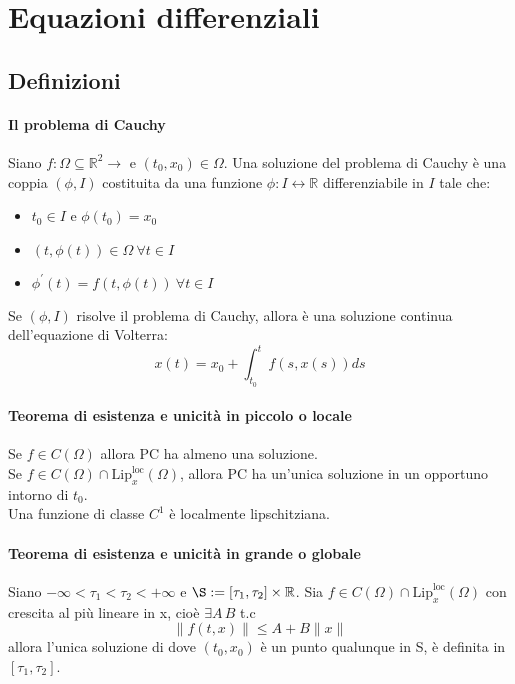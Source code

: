 \documentclass[a4paper,12pt]{article}
\begin{document}
\section{Equazioni differenziali}

\subsection{Definizioni}
\paragraph{Il problema di Cauchy}
Siano $f:\Omega \subseteq \mathbb{R}^2 \longrightarrow $ e $ \left(t_0,x_0\right) \in \Omega.$ Una soluzione del problema di Cauchy è una coppia $\left( \phi , I \right)$ costituita da una funzione $\phi: I \longleftrightarrow \mathbb{R}$ differenziabile in $I$ tale che:
\begin{itemize}
\item $t_0 \in I$ e $ \phi\left(t_0\right)=x_0$
\item $ \left(t,\phi\left(t\right)\right) \in \Omega \ \forall t \in I$
\item $ \phi^{'}\left(t \right) = f\left(t,\phi\left(t\right)\right)\ \forall t \in I$
\end{itemize}

Se $\left(\phi,I\right)$ risolve il problema di Cauchy, allora è una soluzione continua dell'equazione di Volterra:
$$ x\left(t\right) = x_0 + \displaystyle\int^t_{t_0} f\left(s,x\left(s\right)\right) ds $$

\paragraph{Teorema di esistenza e unicità in piccolo o locale}
Se $f \in C\left(\Omega\right)$ allora PC ha almeno una soluzione. \\
Se $f \in C\left(\Omega\right) \cap \text{Lip}^{\text{loc}}_x\left(\Omega\right)$, allora PC ha un'unica soluzione in un opportuno intorno di $t_0$.\\
Una funzione di classe $C^1$ è localmente lipschitziana. 

\paragraph{Teorema di esistenza e unicità in grande o globale}
Siano $-\infty < \tau_1 < \tau_2 < +\infty$ e $\S:=\left[\tau_1,\tau_2\right]\times\mathbb{R}$. Sia $f \in C\left(\Omega\right) \cap \text{Lip}^{\text{loc}}_x\left(\Omega\right)$ con crescita al più lineare in x, cioè $\exists A\,B$ t.c 
$$ \|f \left(t,x\right)\|\leq A + B\|x\|$$
allora l'unica soluzione di
dove $\left(t_0,x_0\right)$ è un punto qualunque in S, è definita in $\left[\tau_1,\tau_2\right]$.
\end{document}
